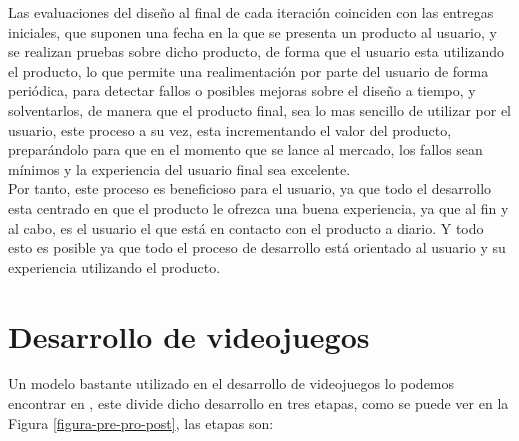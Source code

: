 Las evaluaciones del diseño al final de cada iteración coinciden con las entregas iniciales, que suponen una fecha en la que se presenta un producto al usuario, y se realizan pruebas sobre dicho producto, de forma que el usuario esta utilizando el producto, lo que permite una realimentación por parte del usuario de forma periódica, para detectar fallos o posibles mejoras sobre el diseño a tiempo, y solventarlos, de manera que el producto final, sea lo mas sencillo de utilizar por el usuario, este proceso a su vez, esta incrementando el valor del producto, preparándolo para que en el momento que se lance al mercado, los fallos sean mínimos y la experiencia del usuario final sea excelente.\\

Por tanto, este proceso es beneficioso para el usuario, ya que todo el desarrollo esta centrado en que el producto le ofrezca una buena experiencia, ya que al fin y al cabo, es el usuario el que está en contacto con el producto a diario. Y todo esto es posible ya que todo el proceso de desarrollo está orientado al usuario y su experiencia utilizando el producto.

\section{Desarrollo de videojuegos}
Un modelo bastante utilizado en el desarrollo de videojuegos lo podemos encontrar en \cite{pereira}, este divide dicho desarrollo en tres etapas, como se puede ver en la Figura \ref{figura-pre-pro-post}, las etapas son:

